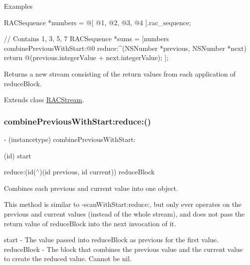 Examples \begin{DoxyVerb} RACSequence *numbers = @[ @1, @2, @3, @4 ].rac_sequence;

 // Contains 1, 3, 5, 7
 RACSequence *sums = [numbers combinePreviousWithStart:@0 reduce:^(NSNumber *previous, NSNumber *next) {
     return @(previous.integerValue + next.integerValue);
 }];
\end{DoxyVerb}


Returns a new stream consisting of the return values from each application of {\ttfamily reduce\+Block}. 

Extends class \mbox{\hyperlink{interface_r_a_c_stream_a698f6ef68be8d3cb34f9be6efaaa5af7}{R\+A\+C\+Stream}}.

\mbox{\label{category_r_a_c_stream_07_operations_08_a698f6ef68be8d3cb34f9be6efaaa5af7}} 
\subsubsection{\texorpdfstring{combine\+Previous\+With\+Start\+:reduce\+:()}{combinePreviousWithStart:reduce:()}\hspace{0.1cm}{\footnotesize\ttfamily [3/3]}}
{\footnotesize\ttfamily -\/ (instancetype) combine\+Previous\+With\+Start\+: \begin{DoxyParamCaption}\item[{(id)}]{start }\item[{reduce:(id($^\wedge$)(id previous, id current))}]{reduce\+Block }\end{DoxyParamCaption}}

Combines each previous and current value into one object.

This method is similar to -\/scan\+With\+Start\+:reduce\+:, but only ever operates on the previous and current values (instead of the whole stream), and does not pass the return value of {\ttfamily reduce\+Block} into the next invocation of it.

start -\/ The value passed into {\ttfamily reduce\+Block} as {\ttfamily previous} for the first value. reduce\+Block -\/ The block that combines the previous value and the current value to create the reduced value. Cannot be nil.

